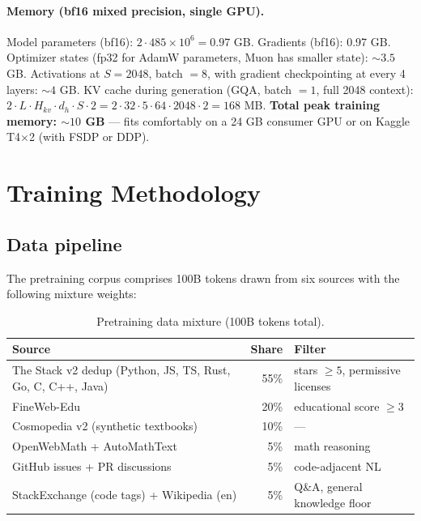 \documentclass[11pt,a4paper]{article}
\theoremstyle{definition}
\theoremstyle{remark}
\begin{document}
\paragraph{Memory (bf16 mixed precision, single GPU).}
Model parameters (bf16): $2 \cdot 485 \times 10^6 = 0.97$ GB.
Gradients (bf16): 0.97 GB.
Optimizer states (fp32 for AdamW parameters, Muon has smaller state):
$\sim 3.5$ GB.
Activations at $S = 2048$, batch $= 8$, with gradient checkpointing at
every 4 layers: $\sim 4$ GB.
KV cache during generation (GQA, batch $= 1$, full 2048 context):
$2 \cdot L \cdot H_{kv} \cdot d_h \cdot S \cdot 2 =
2 \cdot 32 \cdot 5 \cdot 64 \cdot 2048 \cdot 2 = 168$ MB.
\textbf{Total peak training memory: $\sim 10$ GB} --- fits comfortably on
a 24 GB consumer GPU or on Kaggle T4$\times$2 (with FSDP or DDP).

\section{Training Methodology}
\label{sec:training}

\subsection{Data pipeline}

The pretraining corpus comprises 100B tokens drawn from six sources
with the following mixture weights:

\begin{table}[h]
\centering
\small
\begin{tabular}{lrl}
\toprule
\textbf{Source} & \textbf{Share} & \textbf{Filter} \\
\midrule
The Stack v2 dedup (Python, JS, TS, Rust, Go, C, C++, Java) & 55\% & stars $\geq 5$, permissive licenses \\
FineWeb-Edu                                                  & 20\% & educational score $\geq 3$ \\
Cosmopedia v2 (synthetic textbooks)                          & 10\% & --- \\
OpenWebMath + AutoMathText                                   & 5\%  & math reasoning \\
GitHub issues + PR discussions                               & 5\%  & code-adjacent NL \\
StackExchange (code tags) + Wikipedia (en)                   & 5\%  & Q\&A, general knowledge floor \\
\bottomrule
\end{tabular}
\caption{Pretraining data mixture (100B tokens total).}
\label{tab:datamix}
\end{table}
\end{document}
